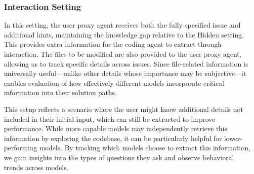 \subsubsection{Interaction Setting}  
\label{subsec:interaction}
In this setting, the user proxy agent receives both the fully specified issue and additional hints, maintaining the knowledge gap relative to the Hidden setting. This provides extra information for the coding agent to extract through interaction. The files to be modified are also provided to the user proxy agent, allowing us to track specific details across issues. Since file-related information is universally useful—unlike other details whose importance may be subjective—it enables evaluation of how effectively different models incorporate critical information into their solution paths.

This setup reflects a scenario where the user might know additional details not included in their initial input, which can still be extracted to improve performance. While more capable models may independently retrieve this information by exploring the codebase, it can be particularly helpful for lower-performing models. By tracking which models choose to extract this information, we gain insights into the types of questions they ask and observe behavioral trends across models.

